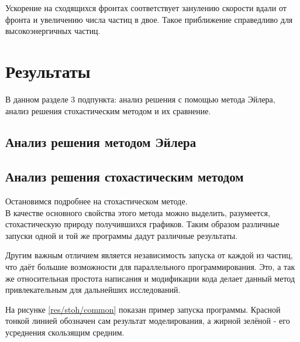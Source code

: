 \documentclass[a4paper,14pt]{extarticle} %
\begin{document}
Ускорение на сходящихся фронтах соответствует занулению скорости вдали от фронта и увеличению числа частиц в двое. Такое приближение справедливо для высокоэнергичных частиц.

\section{Результаты}
В данном разделе 3 подпункта: анализ решения с помощью метода Эйлера, анализ решения стохастическим методом и их сравнение.
\subsection{Анализ решения методом Эйлера}
\subsection{Анализ решения стохастическим методом}
Остановимся подробнее на стохастическом методе.\\
В качестве основного свойства этого метода можно выделить, разумеется, стохастическую природу получившихся графиков. Таким образом различные запуски одной и той же программы дадут различные результаты.

Другим важным отличием является независимость запуска от каждой из частиц, что даёт большие возможности для параллельного программирования. Это, а так же относительная простота написания и модификации кода делает данный метод привлекательным для дальнейших исследований.

На рисунке \ref{res/stoh/common} показан пример запуска программы. Красной тонкой линией обозначен сам результат моделирования, а жирной зелёной - его усреднения скользящим средним.
\end{document}

